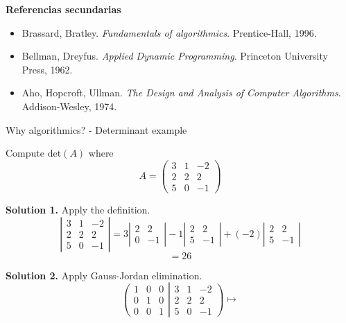 %
\begin{frame}{}
\textbf{Referencias secundarias}
\begin{itemize}
    \item Brassard, Bratley. \textit{Fundamentals of algorithmics}. Prentice-Hall, 1996.
    \item Bellman, Dreyfus. \textit{Applied Dynamic Programming}. Princeton University Press, 1962.
    \item Aho, Hopcroft, Ullman. \textit{The Design and Analysis of Computer Algorithms}. Addison-Wesley, 1974.
\end{itemize}
\end{frame}
%
\begin{frame}{Why algorithmics? - Determinant example}
	\begin{exercise}
		Compute
		\(
			\mathrm{det}(A)
		\)
		where
		\[
			A=
			\left(
				\begin{array}{ccc}
					3 & 1 & -2\\
					2 & 2 & 2\\
					5 & 0 & -1
				\end{array}
			\right)
		\]
	\end{exercise}
\end{frame}
%
\begin{frame}{}
	\textbf{Solution 1.} Apply the definition.
	\[
		\left|
		\begin{array}{ccc}
			3 & 1 & -2\\
			2 & 2 & 2\\
			5 & 0 & -1
		\end{array}
		\right| =
		3
		\left|
		\begin{array}{cc}
			2 & 2\\
			0 & -1
		\end{array}
		\right| -
		1
		\left|
		\begin{array}{cc}
			2 & 2\\
			5 & -1
		\end{array}
		\right| +
		(-2)
		\left|
		\begin{array}{cc}
			2 & 2\\
			5 & -1
		\end{array}
		\right|
	\]
	\[
		= 26
	\]
\end{frame}
%
\begin{frame}{}
	
\end{frame}
%
\begin{frame}{}
	\textbf{Solution 2.} Apply Gauss-Jordan elimination.
	\[
		\left(
			\begin{array}{ccc}
				1 & 0 & 0\\
				0 & 1 & 0\\
				0 & 0 & 1
			\end{array}
		\right.
		\left|
			\begin{array}{ccc}
				3 & 1 & -2\\
				2 & 2 & 2\\
				5 & 0 & -1
			\end{array}
		\right)
		\mapsto
	\]
\end{frame}
